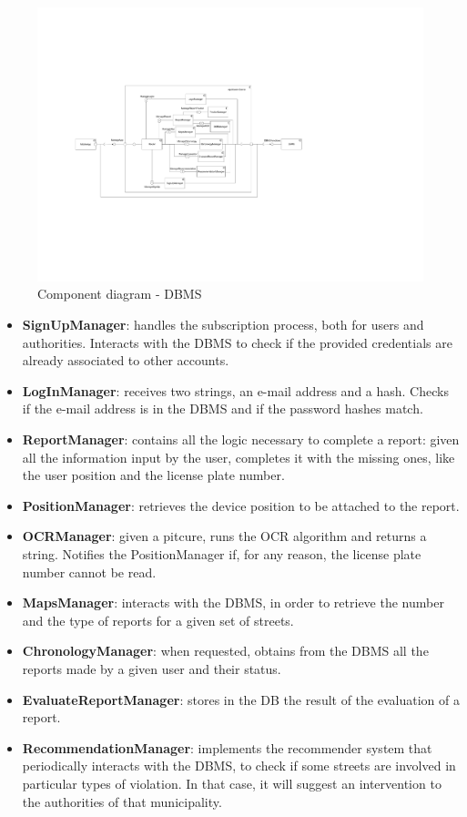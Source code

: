 \documentclass[12pt,a4paper]{report}
\begin{document}
	\begin{figure}[H]
				\includegraphics[scale = 0.4, center]{ComponentDiagramDBMS}
				\caption{Component diagram - DBMS}
	\end{figure}
		\begin{itemize}
			\item\textbf{SignUpManager}: handles the subscription process, both for users and authorities. Interacts with the DBMS to check if the provided
			credentials are already associated to other accounts.
			\item\textbf{LogInManager}: receives two strings, an e-mail address and a hash. Checks if the e-mail address is in the DBMS and if the password
			hashes match.
			\item\textbf{ReportManager}: contains all the logic necessary to complete a report: given all the information input by the user, completes it with
			the missing ones, like the user position and the license plate number.
			\item\textbf{PositionManager}: retrieves the device position to be attached to the report.
			\item\textbf{OCRManager}: given a pitcure, runs the OCR algorithm and returns a string. Notifies the PositionManager if, for any reason, the license
			plate number cannot be read.
			\item\textbf{MapsManager}: interacts with the DBMS, in order to retrieve the number and the type of reports for a given set of streets.
			\item\textbf{ChronologyManager}: when requested, obtains from the DBMS all the reports made by a given user and their status.
			\item\textbf{EvaluateReportManager}: stores in the DB the result of the evaluation of a report.
			\item\textbf{RecommendationManager}: implements the recommender system that periodically interacts with the DBMS, to check if some streets are
			involved in particular types of violation. In that case, it will suggest an intervention to the authorities of that municipality.
		\end{itemize}
		
\end{document}
